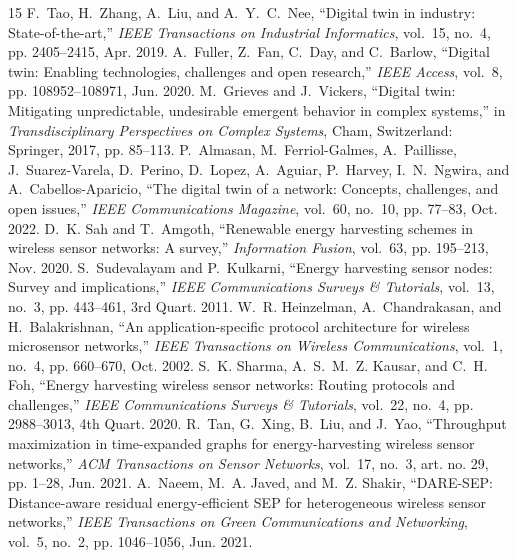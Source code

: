 \documentclass[journal]{IEEEtran}
\begin{document}

\begin{thebibliography}{15}
F.~Tao, H.~Zhang, A.~Liu, and A.~Y.~C.~Nee, ``Digital twin in industry: State-of-the-art,'' \textit{IEEE Transactions on Industrial Informatics}, vol.~15, no.~4, pp. 2405--2415, Apr. 2019.
A.~Fuller, Z.~Fan, C.~Day, and C.~Barlow, ``Digital twin: Enabling technologies, challenges and open research,'' \textit{IEEE Access}, vol.~8, pp. 108952--108971, Jun. 2020.
M.~Grieves and J.~Vickers, ``Digital twin: Mitigating unpredictable, undesirable emergent behavior in complex systems,'' in \textit{Transdisciplinary Perspectives on Complex Systems}, Cham, Switzerland: Springer, 2017, pp. 85--113.
P.~Almasan, M.~Ferriol-Galmes, A.~Paillisse, J.~Suarez-Varela, D.~Perino, D.~Lopez, A.~Aguiar, P.~Harvey, I.~N.~Ngwira, and A.~Cabellos-Aparicio, ``The digital twin of a network: Concepts, challenges, and open issues,'' \textit{IEEE Communications Magazine}, vol.~60, no.~10, pp. 77--83, Oct. 2022.
D.~K. Sah and T.~Amgoth, ``Renewable energy harvesting schemes in wireless sensor networks: A survey,'' \textit{Information Fusion}, vol.~63, pp. 195--213, Nov. 2020.
S.~Sudevalayam and P.~Kulkarni, ``Energy harvesting sensor nodes: Survey and implications,'' \textit{IEEE Communications Surveys \& Tutorials}, vol.~13, no.~3, pp. 443--461, 3rd Quart. 2011.
W.~R. Heinzelman, A.~Chandrakasan, and H.~Balakrishnan, ``An application-specific protocol architecture for wireless microsensor networks,'' \textit{IEEE Transactions on Wireless Communications}, vol.~1, no.~4, pp. 660--670, Oct. 2002.
S.~K. Sharma, A.~S.~M.~Z. Kausar, and C.~H. Foh, ``Energy harvesting wireless sensor networks: Routing protocols and challenges,'' \textit{IEEE Communications Surveys \& Tutorials}, vol.~22, no.~4, pp. 2988--3013, 4th Quart. 2020.
R.~Tan, G.~Xing, B.~Liu, and J.~Yao, ``Throughput maximization in time-expanded graphs for energy-harvesting wireless sensor networks,'' \textit{ACM Transactions on Sensor Networks}, vol.~17, no.~3, art. no. 29, pp. 1--28, Jun. 2021.
A.~Naeem, M.~A. Javed, and M.~Z. Shakir, ``DARE-SEP: Distance-aware residual energy-efficient SEP for heterogeneous wireless sensor networks,'' \textit{IEEE Transactions on Green Communications and Networking}, vol.~5, no.~2, pp. 1046--1056, Jun. 2021.

\end{thebibliography}
\end{document}
